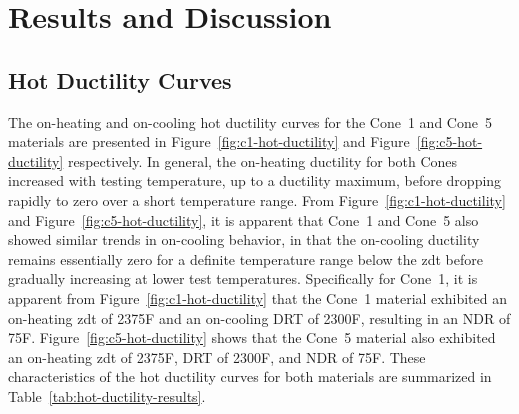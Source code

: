 \chapter{Results and Discussion} \label{ch:results-discussion}

\section{Hot Ductility Curves}
The on-heating and on-cooling hot ductility curves for the Cone~1 and Cone~5 materials are presented in Figure~\ref{fig:c1-hot-ductility} and Figure~\ref{fig:c5-hot-ductility} respectively.  In general, the on-heating ductility for both Cones increased with testing temperature, up to a ductility maximum, before dropping rapidly to zero over a short temperature range.  From Figure~\ref{fig:c1-hot-ductility} and Figure~\ref{fig:c5-hot-ductility}, it is apparent that Cone~1 and Cone~5 also showed similar trends in on-cooling behavior, in that the on-cooling ductility remains essentially zero for a definite temperature range below the \gls{zdt} before gradually increasing at lower test temperatures.  Specifically for Cone~1, it is apparent from Figure~\ref{fig:c1-hot-ductility} that the Cone~1 material exhibited an on-heating \gls{zdt} of 2375\textdegree{}F and an on-cooling DRT of 2300\textdegree{}F, resulting in an NDR of 75F\textdegree{}.  Figure~\ref{fig:c5-hot-ductility} shows that the Cone~5 material also exhibited an on-heating \gls{zdt} of 2375\textdegree{}F, DRT of 2300\textdegree{}F, and NDR of 75F\textdegree{}.  These characteristics of the hot ductility curves for both materials are summarized in Table~\ref{tab:hot-ductility-results}.

